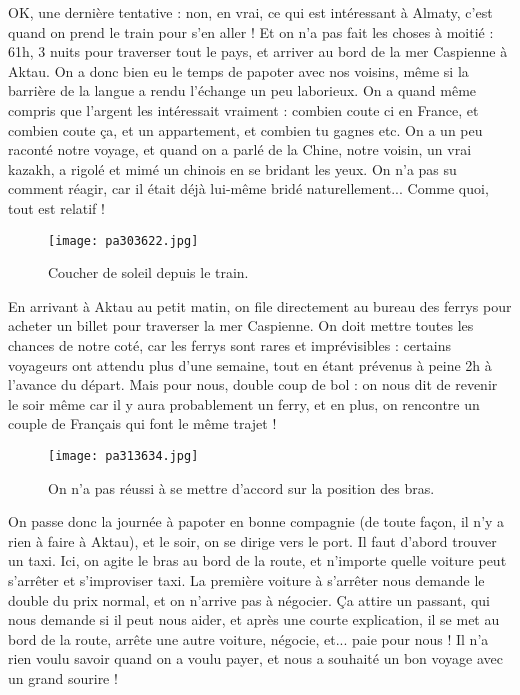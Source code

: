 \documentclass{book}
\begin{document}
OK, une dernière tentative : non, en vrai, ce qui est intéressant à Almaty, c'est quand on prend le train pour s'en aller ! Et on n'a pas fait les choses à moitié : 61h, 3 nuits pour traverser tout le pays, et arriver au bord de la mer Caspienne à Aktau. On a donc bien eu le temps de papoter avec nos voisins, même si la barrière de la langue a rendu l'échange un peu laborieux. On a quand même compris que l'argent les intéressait vraiment : combien coute ci en France, et combien coute ça, et un appartement, et combien tu gagnes etc. On a un peu raconté notre voyage, et quand on a parlé de la Chine, notre voisin, un vrai kazakh, a rigolé et mimé un chinois en se bridant les yeux. On n'a pas su comment réagir, car il était déjà lui-même bridé naturellement... Comme quoi, tout est relatif !


\begin{figure}[h]
\centering
\texttt{[image: pa303622.jpg]}
\caption*{Coucher de soleil depuis le train.}
\end{figure}

En arrivant à Aktau au petit matin, on file directement au bureau des ferrys pour acheter un billet pour traverser la mer Caspienne. On doit mettre toutes les chances de notre coté, car les ferrys sont rares et imprévisibles : certains voyageurs ont attendu plus d'une semaine, tout en étant prévenus à peine 2h à l'avance du départ. Mais pour nous, double coup de bol : on nous dit de revenir le soir même car il y aura probablement un ferry, et en plus, on rencontre un couple de Français qui font le même trajet !


\begin{figure}[h]
\centering
\texttt{[image: pa313634.jpg]}
\caption*{On n'a pas réussi à se mettre d'accord sur la position des bras.}
\end{figure}

On passe donc la journée à papoter en bonne compagnie (de toute façon, il n'y a rien à faire à Aktau), et le soir, on se dirige vers le port. Il faut d'abord trouver un taxi. Ici, on agite le bras au bord de la route, et n'importe quelle voiture peut s'arrêter et s'improviser taxi. La première voiture à s'arrêter nous demande le double du prix normal, et on n'arrive pas à négocier. Ça attire un passant, qui nous demande si il peut nous aider, et après une courte explication, il se met au bord de la route, arrête une autre voiture, négocie, et... paie pour nous ! Il n'a rien voulu savoir quand on a voulu payer, et nous a souhaité un bon voyage avec un grand sourire !
\end{document}
